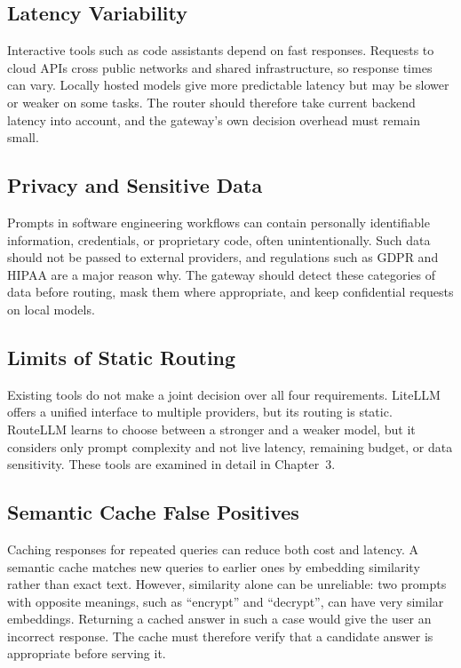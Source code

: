 \subsection{Latency Variability}
Interactive tools such as code assistants depend on fast responses. Requests to cloud APIs cross public networks and shared infrastructure, so response times can vary. Locally hosted models give more predictable latency but may be slower or weaker on some tasks. The router should therefore take current backend latency into account, and the gateway's own decision overhead must remain small.

\subsection{Privacy and Sensitive Data}
Prompts in software engineering workflows can contain personally identifiable information, credentials, or proprietary code, often unintentionally. Such data should not be passed to external providers, and regulations such as GDPR and HIPAA are a major reason why. The gateway should detect these categories of data before routing, mask them where appropriate, and keep confidential requests on local models.

\subsection{Limits of Static Routing}
Existing tools do not make a joint decision over all four requirements. LiteLLM offers a unified interface to multiple providers, but its routing is static. RouteLLM \cite{ref:RouteLLM} learns to choose between a stronger and a weaker model, but it considers only prompt complexity and not live latency, remaining budget, or data sensitivity. These tools are examined in detail in Chapter~3.

\subsection{Semantic Cache False Positives}
Caching responses for repeated queries can reduce both cost and latency. A semantic cache \cite{ref:GPTCache} matches new queries to earlier ones by embedding similarity rather than exact text. However, similarity alone can be unreliable: two prompts with opposite meanings, such as ``encrypt'' and ``decrypt'', can have very similar embeddings. Returning a cached answer in such a case would give the user an incorrect response. The cache must therefore verify that a candidate answer is appropriate before serving it.

